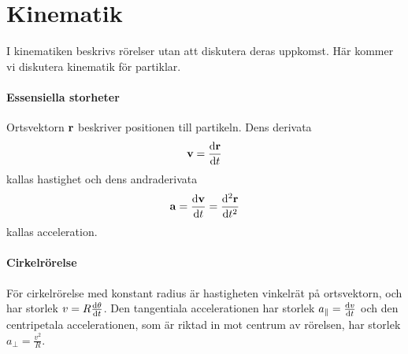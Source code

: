 \section{Kinematik}

I kinematiken beskrivs rörelser utan att diskutera deras uppkomst. Här kommer vi diskutera kinematik för partiklar.

\paragraph{Essensiella storheter}
Ortsvektorn $\vect{r}$ beskriver positionen till partikeln. Dens derivata
\begin{align*}
	\vect{v} = \dv{\vect{r}}{t}
\end{align*}
kallas hastighet och dens andraderivata
\begin{align*}
	\vect{a} = \dv{\vect{v}}{t} = \dv[2]{\vect{r}}{t}
\end{align*}
kallas acceleration.

\paragraph{Cirkelrörelse}
För cirkelrörelse med konstant radius är hastigheten vinkelrät på ortsvektorn, och har storlek $v = R\dv{\theta}{t}$. Den tangentiala accelerationen har storlek $a_{\parallel} = \dv{v}{t}$ och den centripetala accelerationen, som är riktad in mot centrum av rörelsen, har storlek $a_{\perp} = \frac{v^2}{R}$.